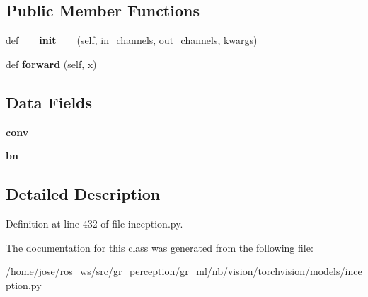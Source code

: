 \subsection*{Public Member Functions}
\begin{DoxyCompactItemize}
\item 
\mbox{\label{classtorchvision_1_1models_1_1inception_1_1BasicConv2d_a2bd3562317533e3273b0a9f231088b34}} 
def {\bfseries \+\_\+\+\_\+init\+\_\+\+\_\+} (self, in\+\_\+channels, out\+\_\+channels, kwargs)
\item 
\mbox{\label{classtorchvision_1_1models_1_1inception_1_1BasicConv2d_a83109241cad4317e468635ae9d7cc9cb}} 
def {\bfseries forward} (self, x)
\end{DoxyCompactItemize}
\subsection*{Data Fields}
\begin{DoxyCompactItemize}
\item 
\mbox{\label{classtorchvision_1_1models_1_1inception_1_1BasicConv2d_a9d1809e67dfeb1cf55633f92543a7aa2}} 
{\bfseries conv}
\item 
\mbox{\label{classtorchvision_1_1models_1_1inception_1_1BasicConv2d_a91f89397952a9db169a5403e5fdf52e6}} 
{\bfseries bn}
\end{DoxyCompactItemize}


\subsection{Detailed Description}


Definition at line 432 of file inception.\+py.



The documentation for this class was generated from the following file\+:\begin{DoxyCompactItemize}
\item 
/home/jose/ros\+\_\+ws/src/gr\+\_\+perception/gr\+\_\+ml/nb/vision/torchvision/models/inception.\+py\end{DoxyCompactItemize}
